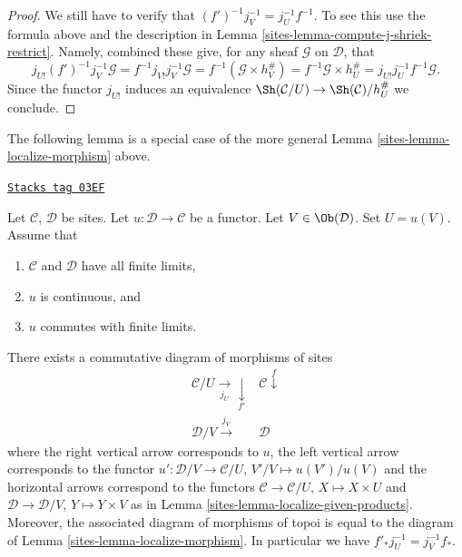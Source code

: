 \begin{proof}
\medskip\noindent
We still have to verify that $(f')^{-1}j_V^{-1} = j_U^{-1}f^{-1}$.
To see this use the formula above and the description
in Lemma \ref{sites-lemma-compute-j-shriek-restrict}. Namely,
combined these give, for any sheaf $\mathcal{G}$ on $\mathcal{D}$, that
$$
j_{U!}(f')^{-1}j_V^{-1}\mathcal{G}
=
f^{-1}j_{V!}j_V^{-1}\mathcal{G}
=
f^{-1}(\mathcal{G} \times h_V^\#)
=
f^{-1}\mathcal{G} \times h_U^\#
=
j_{U!}j_U^{-1}f^{-1}\mathcal{G}.
$$
Since the functor $j_{U!}$ induces an equivalence
$\Sh(\mathcal{C}/U) \to \Sh(\mathcal{C})/h_U^\#$
we conclude.
\end{proof}

The following lemma is a special case of the more general
Lemma \ref{sites-lemma-localize-morphism}
above.

\begin{lemma}
\label{sites-lemma-localize-morphism-strong}
\href{https://stacks.math.columbia.edu/tag/03EF}{\texttt{Stacks tag 03EF}}

Let $\mathcal{C}$, $\mathcal{D}$ be sites.
Let $u : \mathcal{D} \to \mathcal{C}$ be a functor.
Let $V \in \Ob(\mathcal{D})$. Set $U = u(V)$.
Assume that
\begin{enumerate}
\item $\mathcal{C}$ and $\mathcal{D}$ have
all finite limits,
\item $u$ is continuous, and
\item $u$ commutes with finite limits.
\end{enumerate}
There exists a commutative diagram of morphisms of sites
$$
\begin{array}{cc}\mathcal{C}/U \underset{j_U}{\longrightarrow}\underset{f'}{\downarrow} & \mathcal{C} \overset{f}{\downarrow} \\ \mathcal{D}/V \overset{j_V}{\longrightarrow} & \mathcal{D}\end{array}
$$
where the right vertical arrow corresponds to $u$,
the left vertical arrow corresponds to the
functor $u' : \mathcal{D}/V \to \mathcal{C}/U$, $V'/V \mapsto u(V')/u(V)$
and the horizontal arrows correspond to the functors
$\mathcal{C} \to \mathcal{C}/U$, $X \mapsto X \times U$
and $\mathcal{D} \to \mathcal{D}/V$, $Y \mapsto Y \times V$
as in Lemma \ref{sites-lemma-localize-given-products}.
Moreover, the associated diagram of morphisms of topoi is
equal to the diagram of
Lemma \ref{sites-lemma-localize-morphism}.
In particular we have $f'_*j_U^{-1} = j_V^{-1}f_*$.
\end{lemma}

